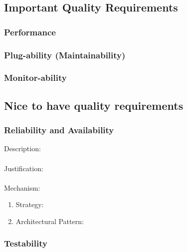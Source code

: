 \documentclass[a4paper,12pt,titlepage]{article}
\begin{document}
\subsection{Important Quality Requirements}

\subsubsection{Performance}%
	
	\newpage
\subsubsection{Plug-ability (Maintainability)}%
	
\newpage
\subsubsection{Monitor-ability}%

\newpage
\subsection{Nice to have quality requirements}
\subsubsection{Reliability and Availability}%
	Description: \\\\
	Justification: \\\\
	Mechanism:
	\begin{enumerate}
		\item Strategy: 
		\item Architectural Pattern:
	\end{enumerate}
\subsubsection{Testability}%

\newpage
\end{document}

